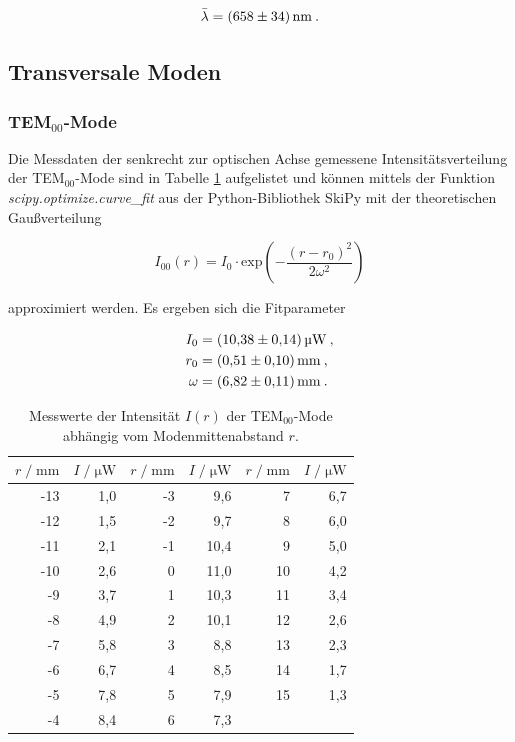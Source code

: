 \vspace{-5pt}
\begin{equation*}
    \bar{\lambda} = \SI{658 +- 34}{\nano\meter} \: .
\end{equation*}

\subsection{Transversale Moden}
\subsubsection{TEM$_{00}$-Mode}

Die Messdaten der senkrecht zur optischen Achse gemessene Intensitätsverteilung
der TEM$_{00}$-Mode sind in Tabelle \ref{tab:TEM00} aufgelistet und können
mittels der Funktion \textit{scipy.optimize.curve\_fit} aus der Python-Bibliothek SkiPy
mit der theoretischen Gaußverteilung 

\vspace{-5pt}
\begin{equation}
    I_{00}(r) = I_0 \cdot \text{exp}\left(-\frac{(r-r_0)^2}{2 \omega^2}\right)
\end{equation}

approximiert werden. Es ergeben sich die Fitparameter

\vspace{-15pt}
\begin{align*}
    I_0 &= \SI{10.38 +- 0.14}{\micro\watt} \: ,\\
    r_0 &= \SI{0.51 +- 0.10}{\milli\meter} \: , \\
    \omega &= \SI{6.82 +- 0.11}{\milli\meter} \: .
\end{align*}

\begin{table}[H]
    \centering
    \footnotesize
    \caption{Messwerte der Intensität $I(r)$ der TEM$_{00}$-Mode abhängig vom Modenmittenabstand $r$.}
    \label{tab:TEM00}
    \begin{tabular}{r r | r r | r r}
    \toprule
    $r \;/\; \si{\milli\meter}$ & $I \;/\; \si{\micro\watt}$ & $r \;/\; \si{\milli\meter}$ & $I \;/\; \si{\micro\watt}$
    & $r \;/\; \si{\milli\meter}$ & $I \;/\; \si{\micro\watt}$ \\
    \midrule
        -13 & 1,0 & -3 &  9,6 &  7 & 6,7 \\
        -12 & 1,5 & -2 &  9,7 &  8 & 6,0 \\
        -11 & 2,1 & -1 & 10,4 &  9 & 5,0 \\
        -10 & 2,6 &  0 & 11,0 & 10 & 4,2 \\
         -9 & 3,7 &  1 & 10,3 & 11 & 3,4 \\
         -8 & 4,9 &  2 & 10,1 & 12 & 2,6 \\
         -7 & 5,8 &  3 &  8,8 & 13 & 2,3 \\
         -6 & 6,7 &  4 &  8,5 & 14 & 1,7 \\
         -5 & 7,8 &  5 &  7,9 & 15 & 1,3 \\
         -4 & 8,4 &  6 &  7,3 \\
    \bottomrule
    \end{tabular}
\end{table}


